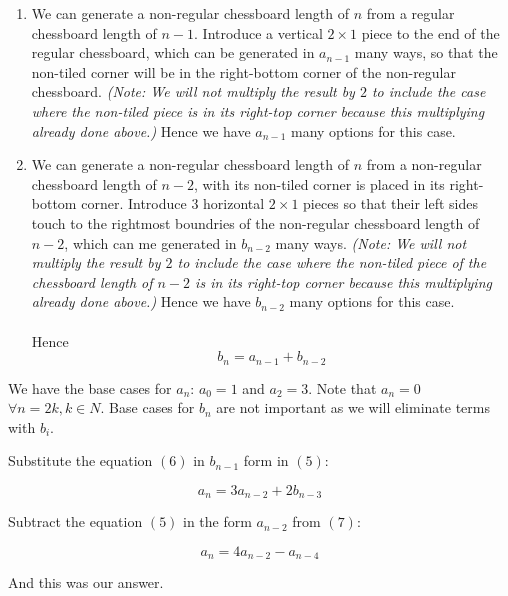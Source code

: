 \documentclass[12pt]{article}
\begin{document}
\begin{enumerate}
\item
We can generate a non-regular chessboard length of $n$ from a regular chessboard length of $n-1$. Introduce a vertical $2\times 1$ piece to the end of the regular chessboard, which can be generated in $a_{n-1}$ many ways, so that the non-tiled corner will be in the right-bottom corner of the non-regular chessboard. \textit{(Note: We will not multiply the result by $2$ to include the case where the non-tiled piece is in its right-top corner because this multiplying already done above.)} Hence we have $a_{n-1}$ many options for this case.
\item
We can generate a non-regular chessboard length of $n$ from a non-regular chessboard length of $n-2$, with its non-tiled corner is placed in its right-bottom corner. Introduce $3$ horizontal $2\times 1$ pieces so that their left sides touch to the rightmost boundries of the non-regular chessboard length of $n-2$, which can me generated in $b_{n-2}$ many ways. \textit{(Note: We will not multiply the result by $2$ to include the case where the non-tiled piece of the chessboard length of $n-2$ is in its right-top corner because this multiplying already done above.)} Hence we have $b_{n-2}$ many options for this case.\\ \\
Hence \begin{equation}b_n=a_{n-1}+b_{n-2} \end{equation}
\end{enumerate}

We have the base cases for $a_n$: $a_0=1$ and $a_2=3$. Note that $a_n=0$ $\forall n=2k, k\in N$. Base cases for $b_n$ are not important as we will eliminate terms with $b_i$.

Substitute the equation $(6)$ in $b_{n-1}$ form in $(5)$:

\begin{equation} a_n=3a_{n-2}+2b_{n-3}\end{equation}

Subtract the equation $(5)$ in the form $a_{n-2}$ from $(7)$:

$$a_n=4a_{n-2}-a_{n-4}$$

And this was our answer.
\end{document}
